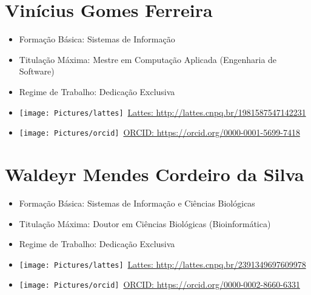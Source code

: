 \documentclass[11pt,fleqn]{book} %
\begin{document}
\section{Vinícius Gomes Ferreira}\label{ViniciusGomes}
\begin{itemize}
	\item Formação Básica: Sistemas de Informação  
	\item Titulação Máxima: Mestre em Computação Aplicada (Engenharia de Software)
	\item Regime de Trabalho: Dedicação Exclusiva
	\item \texttt{[image: Pictures/lattes]}~\href{ http://lattes.cnpq.br/1981587547142231}{Lattes:  http://lattes.cnpq.br/1981587547142231}
	\item \texttt{[image: Pictures/orcid]}~\href{https://orcid.org/0000-0002-8660-6331}{ORCID: https://orcid.org/0000-0001-5699-7418}
\end{itemize}

\section{Waldeyr Mendes Cordeiro da Silva}\label{WaldeyrMendes}
\begin{itemize}
	\item Formação Básica: Sistemas de Informação e Ciências Biológicas 
	\item Titulação Máxima: Doutor em Ciências Biológicas (Bioinformática)
	\item Regime de Trabalho: Dedicação Exclusiva
	\item \texttt{[image: Pictures/lattes]}~\href{http://lattes.cnpq.br/2391349697609978}{Lattes: http://lattes.cnpq.br/2391349697609978}
	\item \texttt{[image: Pictures/orcid]}~\href{https://orcid.org/0000-0002-8660-6331}{ORCID: https://orcid.org/0000-0002-8660-6331}
\end{itemize}



%
\end{document}
